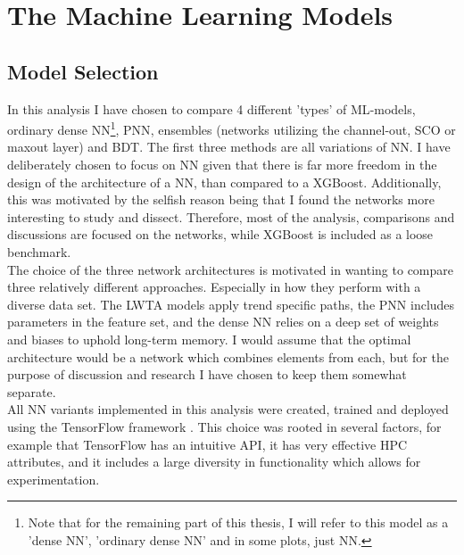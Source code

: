 \section{The Machine Learning Models}
\subsection{Model Selection}
In this analysis I have chosen to compare 4 different 'types' of \ac{ML}-models, ordinary dense \acf{NN}\footnote{Note 
that for the remaining part of this thesis, I will refer to this model as a 'dense \ac{NN}', 'ordinary dense \ac{NN}' 
and in some plots, just \ac{NN}.}, \acf{PNN}, ensembles (networks utilizing the channel-out, \ac{SCO} or maxout layer) 
and \acf{BDT}. The first three methods are all variations of \ac{NN}. I have deliberately 
chosen to focus on \ac{NN} given that there is far more freedom in the design of the architecture
of a \ac{NN}, than compared to a XGBoost. Additionally, this was motivated by the selfish reason
being that I found the networks more interesting to study and dissect. Therefore, most of the 
analysis, comparisons and discussions are focused on the networks, while XGBoost is included 
as a loose benchmark. 
\\
The choice of the three network architectures is motivated in wanting to compare three relatively different approaches.
Especially in how they perform with a diverse data set. The \ac{LWTA} models apply trend specific paths, the \ac{PNN} includes 
parameters in the feature set, and the dense \ac{NN} relies on a deep set of weights and biases to uphold long-term memory.
I would assume that the optimal architecture would be a network which combines elements from each, but for the purpose of discussion
and research I have chosen to keep them somewhat separate. 
\\
All \ac{NN} variants implemented in this analysis were created, trained and deployed using the TensorFlow framework \cite{tensorflow}.
This choice was rooted in several factors, for example that TensorFlow has an intuitive \ac{API}, it has very effective
\ac{HPC} attributes, and it includes a large diversity in functionality which allows for experimentation.
